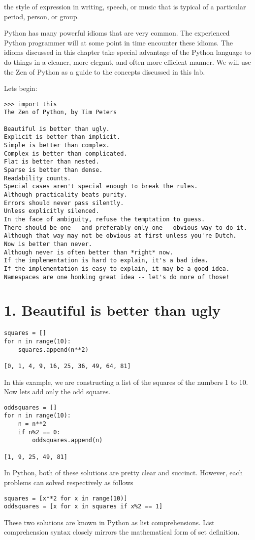\label{lab:Extensions_Idioms}


\begin{definition}[Idiom]
the style of expression in writing, speech, or music that is typical of a particular period, person, or group.
\end{definition}

Python has many powerful idioms that are very common.  The experienced Python programmer will at some point in time encounter these idioms.  The idioms discussed in this chapter take special advantage of the Python language to do things in a cleaner, more elegant, and often more efficient manner.  We will use the Zen of Python as a guide to the concepts discussed in this lab.

Lets begin:
\begin{lstlisting}
>>> import this
The Zen of Python, by Tim Peters

Beautiful is better than ugly.
Explicit is better than implicit.
Simple is better than complex.
Complex is better than complicated.
Flat is better than nested.
Sparse is better than dense.
Readability counts.
Special cases aren't special enough to break the rules.
Although practicality beats purity.
Errors should never pass silently.
Unless explicitly silenced.
In the face of ambiguity, refuse the temptation to guess.
There should be one-- and preferably only one --obvious way to do it.
Although that way may not be obvious at first unless you're Dutch.
Now is better than never.
Although never is often better than *right* now.
If the implementation is hard to explain, it's a bad idea.
If the implementation is easy to explain, it may be a good idea.
Namespaces are one honking great idea -- let's do more of those!
\end{lstlisting}

\section*{1. Beautiful is better than ugly}
\begin{lstlisting}
squares = []
for n in range(10):
    squares.append(n**2)
    
[0, 1, 4, 9, 16, 25, 36, 49, 64, 81]
\end{lstlisting}
In this example, we are constructing a list of the squares of the numbers 1 to 10.
Now lets add only the odd squares.
\begin{lstlisting}
oddsquares = []
for n in range(10):
    n = n**2
    if n%2 == 0:
        oddsquares.append(n)
        
[1, 9, 25, 49, 81]
\end{lstlisting}
In Python, both of these solutions are pretty clear and succinct.
However, each problems can solved respectively as follows
\begin{lstlisting}
squares = [x**2 for x in range(10)]
oddsquares = [x for x in squares if x%2 == 1]
\end{lstlisting}
These two solutions are known in Python as list comprehensions.
List comprehension syntax closely mirrors the mathematical form of set definition.

